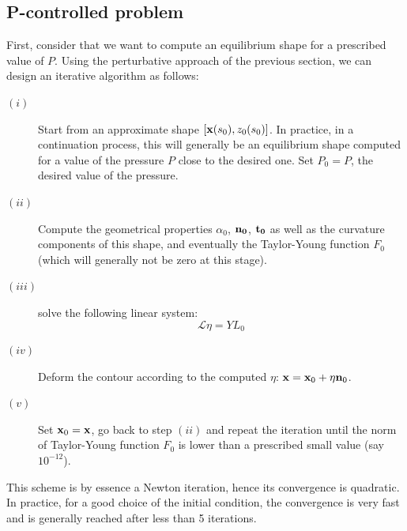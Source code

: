 \documentclass{jfm}
\newcommand\be{\begin{equation}}
\newcommand\ee{\end{equation}}
\begin{document}
\subsection{P-controlled problem}

First, consider that we want to compute an equilibrium shape for a prescribed value of $P$. Using the perturbative approach of the previous section, we can design an iterative algorithm as follows:

\begin{description}

\item[$(i)$ ] Start from an approximate shape $[{\bf x}(s_0), z_0(s_0)]$. In practice, in a continuation process, this will generally be an equilibrium shape computed for a value of the pressure $P$ close to the desired one. Set 
$P_0= P$, the desired value of the pressure.

\item[$(ii)$ ] Compute the geometrical properties $\alpha_0$, $\bf n_0$, $\bf t_0$ as well as the curvature components of this shape, and eventually the Taylor-Young function $F_0$ (which will generally not be zero at this stage).

\item[$(iii)$ ] solve the following linear system: 
\be
{\mathcal L} \eta = YL_0
\ee

\item[$(iv)$ ] Deform the contour according to the computed $\eta$:  ${\bf x} = {\bf x}_0 + \eta {\bf n}_0$. 

\item[$(v)$ ] Set ${\bf x}_0 = {\bf x}$, go back to step $(ii)$ and repeat the iteration until the norm of Taylor-Young function $F_0$ is lower than a prescribed small value (say $10^{-12}$). 

\end{description}

This scheme is by essence a Newton iteration, hence its convergence is quadratic. In practice, for a good choice of the initial condition, the convergence is very fast and is generally reached after less than 5 iterations.
\end{document}
